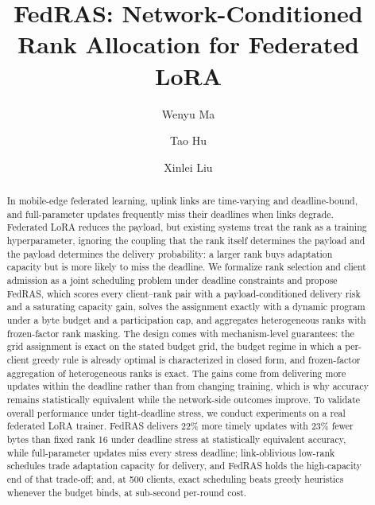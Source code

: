 \documentclass[a4paper,fleqn]{cas-dc}
\begin{document}
\title[mode=title]{FedRAS: Network-Conditioned Rank Allocation for Federated LoRA}
\author[1,2,3]{Wenyu Ma}
\author[1,2,3]{Tao Hu}\cormark[1]
\author[1,2,3]{Xinlei Liu}

\begin{abstract}
In mobile-edge federated learning, uplink links are time-varying and deadline-bound, and full-parameter updates frequently miss their deadlines when links degrade. Federated LoRA reduces the payload, but existing systems treat the rank as a training hyperparameter, ignoring the coupling that the rank itself determines the payload and the payload determines the delivery probability: a larger rank buys adaptation capacity but is more likely to miss the deadline. We formalize rank selection and client admission as a joint scheduling problem under deadline constraints and propose FedRAS, which scores every client--rank pair with a payload-conditioned delivery risk and a saturating capacity gain, solves the assignment exactly with a dynamic program under a byte budget and a participation cap, and aggregates heterogeneous ranks with frozen-factor rank masking. The design comes with mechanism-level guarantees: the grid assignment is exact on the stated budget grid, the budget regime in which a per-client greedy rule is already optimal is characterized in closed form, and frozen-factor aggregation of heterogeneous ranks is exact. The gains come from delivering more updates within the deadline rather than from changing training, which is why accuracy remains statistically equivalent while the network-side outcomes improve. To validate overall performance under tight-deadline stress, we conduct experiments on a real federated LoRA trainer. FedRAS delivers 22\% more timely updates with 23\% fewer bytes than fixed rank 16 under deadline stress at statistically equivalent accuracy, while full-parameter updates miss every stress deadline; link-oblivious low-rank schedules trade adaptation capacity for delivery, and FedRAS holds the high-capacity end of that trade-off; and, at 500 clients, exact scheduling beats greedy heuristics whenever the budget binds, at sub-second per-round cost.
\end{abstract}
\end{document}

